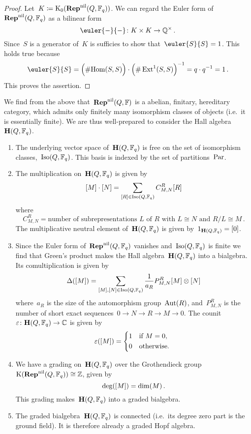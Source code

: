 \documentclass[a4paper,11pt]{scrartcl}
\begin{document}
\begin{proof}
  Let~$K \coloneqq \operatorname{K}_0(\mathbf{Rep}^{\mathrm{nil}}(Q, \mathbb{F}_q))$.
  We can regard the Euler form of~$\mathbf{Rep}^{\mathrm{nil}}(Q, \mathbb{F}_q)$ as a bilinear form
  \[
    \euler{-}{-}
    \colon
    K \times K
    \to
    \Rational^\times \,.
  \]
  Since~$S$ is a generator of~$K$ is sufficies to show that~$\euler{S}{S} = 1$.
  This holds true because
  \[
    \euler{S}{S}
    =
    \Bigl( \counting {\Hom(S,S)} \Bigr)
    \cdot
    \Bigl( \counting \Ext^1(S,S) \Bigr)^{-1}
    =
    q \cdot q^{-1}
    =
    1 \,.
  \]
  This proves the assertion.
\end{proof}

We find from the above that~$\mathbf{Rep}^{\mathrm{nil}}(Q, \mathbb{F})$ is a abelian, finitary, hereditary category, which admits only finitely many isomorphism classes of objects (i.e.\ it is essentially finite).
We are thus well-prepared to consider the Hall algebra~$\mathbf{H}(Q, \mathbb{F}_q)$.
\begin{enumerate}
  \item
    The underlying vector space of~$\mathbf{H}(Q, \mathbb{F}_q)$ is free on the set of isomorphism classes,~$\operatorname{Iso}(Q, \mathbb{F}_q)$.
    This basis is indexed by the set of partitions~$\mathrm{Par}$.
  \item
    The multiplication on~$\mathbf{H}(Q, \mathbb{F}_q)$ is given by
    \[
      [M] \cdot [N]
      =
      \sum_{[R] \in \operatorname{Iso}(Q, \mathbb{F}_q)}
      C^R_{M,N} [R]
    \]
    where
    \[
      C^R_{M,N}
      =
      \text{number of subrepresentations~$L$ of~$R$ with~$L \cong N$ and~$R/L \cong M$} \,.
    \]
    The multiplicative neutral element of~$\mathbf{H}(Q, \mathbb{F}_q)$ is given by~$1_{\mathbf{H}(Q, \mathbb{F}_q)} = [0]$.
  \item
    Since the Euler form of~$\mathbf{Rep}^{\mathrm{nil}}(Q, \mathbb{F}_q)$ vanishes and~$\operatorname{Iso}(Q, \mathbb{F}_q)$ is finite we find that Green’s product makes the Hall algebra~$\mathbf{H}(Q, \mathbb{F}_q)$ into a bialgebra.
    Its comultiplication is given by
    \[
      \Delta([M])
      =
      \sum_{[M], [N] \in \operatorname{Iso}(Q, \mathbb{F}_q)}
      \frac{1}{a_R} P^R_{M,N} [M] \otimes [N]
    \]
    where~$a_R$ is the size of the automorphism group~$\operatorname{Aut}(R)$, and~$P^R_{M,N}$ is the number of short exact sequences~$0 \to N \to R \to M \to 0$.
    The counit~$\varepsilon \colon \mathbf{H}(Q, \mathbb{F}_q) \to \mathbb{C}$ is given by
    \[
      \varepsilon(\class{M})
      =
      \begin{cases*}
          1
          &
          if~$M = 0$,
          \\
          0
          &
          otherwise.
      \end{cases*}
    \]
  \item
    We have a grading on~$\mathbf{H}(Q, \mathbb{F}_q)$ over the Grothendieck group~$\operatorname{K}(\mathbf{Rep}^{\mathrm{nil}}(Q, \mathbb{F}_q)) \cong \mathbb{Z}$, given by
    \[
      \deg( [M] )
      =
      \dim(M) \,.
    \]
    This grading makes~$\mathbf{H}(Q, \mathbb{F}_q)$ into a graded bialgebra.
  \item
    The graded bialgebra~$\mathbf{H}(Q, \mathbb{F}_q)$ is connected (i.e.\ its degree zero part is the ground field).
    It is therefore already a graded Hopf algebra.
\end{enumerate}
\end{document}
